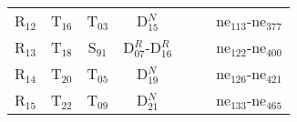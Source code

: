 \begin{table}[H]
{\begin{center}
{\begin{tabular}{ c c c c c c c }
                    R$_{12}$ & T$_{16}$ & T$_{03}$ & D$_{15}^{N}$ &  &  & ne$_{113}$-ne$_{377}$\\
                    R$_{13}$ & T$_{18}$ & S$_{91}$ & D$_{07}^{R}$-D$_{16}^{R}$ &  &  & ne$_{122}$-ne$_{400}$\\
                    R$_{14}$ & T$_{20}$ & T$_{05}$ & D$_{19}^{N}$ &  &  & ne$_{126}$-ne$_{421}$\\
                    R$_{15}$ & T$_{22}$ & T$_{09}$ & D$_{21}^{N}$ &  &  & ne$_{133}$-ne$_{465}$\\
                \hline
            \end{tabular}
        }
    	\end{center}
     }
    \end{table}

	
